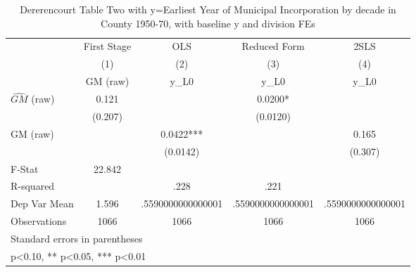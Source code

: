 \begin{table}[htbp]\centering
\def\sym#1{\ifmmode^{#1}\else\(^{#1}\)\fi}
\caption{Dererencourt Table Two with y=Earliest Year of Municipal Incorporation by decade in County 1950-70, with baseline y and division FEs}
\begin{tabular}{l*{4}{c}}
\toprule
                    & First Stage   &         OLS   &Reduced Form   &        2SLS   \\
                    &\multicolumn{1}{c}{(1)}&\multicolumn{1}{c}{(2)}&\multicolumn{1}{c}{(3)}&\multicolumn{1}{c}{(4)}\\
                    &\multicolumn{1}{c}{GM  (raw)}&\multicolumn{1}{c}{y\_L0}&\multicolumn{1}{c}{y\_L0}&\multicolumn{1}{c}{y\_L0}\\
\midrule
$\hat{GM}$ (raw)    &       0.121   &               &      0.0200*  &               \\
                    &     (0.207)   &               &    (0.0120)   &               \\
\addlinespace
GM  (raw)           &               &      0.0422***&               &       0.165   \\
                    &               &    (0.0142)   &               &     (0.307)   \\
\midrule
F-Stat              &      22.842   &               &               &               \\
R-squared           &               &        .228   &        .221   &               \\
Dep Var Mean        &       1.596   &.5590000000000001   &.5590000000000001   &.5590000000000001   \\
Observations        &        1066   &        1066   &        1066   &        1066   \\
\bottomrule
\multicolumn{5}{l}{\footnotesize Standard errors in parentheses}\\
\multicolumn{5}{l}{\footnotesize * p<0.10, ** p<0.05, *** p<0.01}\\
\end{tabular}
\end{table}
